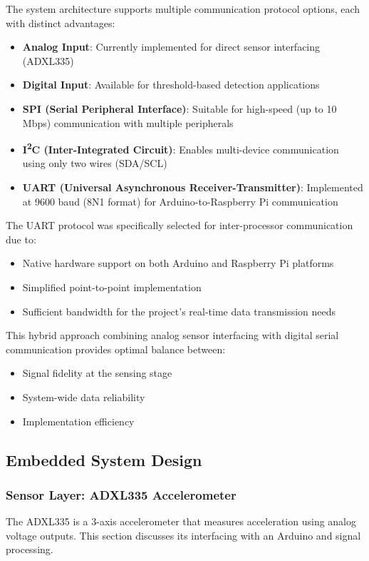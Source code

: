 {{		The system architecture supports multiple communication protocol options, each with distinct advantages:
		
		\begin{itemize}
			\item \textbf{Analog Input}: Currently implemented for direct sensor interfacing (ADXL335)
			\item \textbf{Digital Input}: Available for threshold-based detection applications
			\item \textbf{SPI (Serial Peripheral Interface)}: Suitable for high-speed (up to 10 Mbps) communication with multiple peripherals
			\item \textbf{I\textsuperscript{2}C (Inter-Integrated Circuit)}: Enables multi-device communication using only two wires (SDA/SCL)
			\item \textbf{UART (Universal Asynchronous Receiver-Transmitter)}: Implemented at 9600 baud (8N1 format) for Arduino-to-Raspberry Pi communication
		\end{itemize}
		
		The UART protocol was specifically selected for inter-processor communication due to:
		\begin{itemize}
			\item Native hardware support on both Arduino and Raspberry Pi platforms
			\item Simplified point-to-point implementation
			\item Sufficient bandwidth for the project's real-time data transmission needs
		\end{itemize}
		
		This hybrid approach combining analog sensor interfacing with digital serial communication provides optimal balance between:
		\begin{itemize}
			\item Signal fidelity at the sensing stage
			\item System-wide data reliability
			\item Implementation efficiency
		\end{itemize}
	}
 
 
 
	 
	 
	\subsection{Embedded System Design} 
	{
		\subsubsection{Sensor Layer: ADXL335 Accelerometer}  
		The ADXL335 is a 3-axis accelerometer that measures acceleration using analog voltage outputs. This section discusses its interfacing with an Arduino and signal processing.  
		
}}
